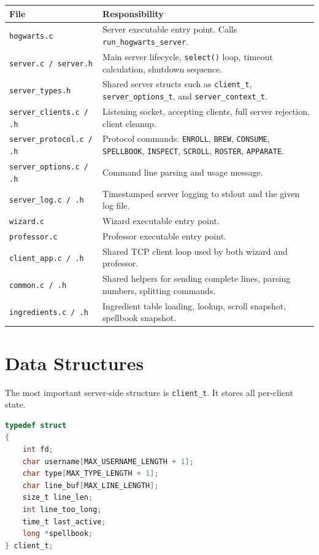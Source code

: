\documentclass[11pt,a4paper]{article}
\begin{document}
\begin{longtable}{|p{4.1cm}|p{10.1cm}|}
\hline
\textbf{File} & \textbf{Responsibility} \\
\hline
\texttt{hogwarts.c} & Server executable entry point. Calls \texttt{run\_hogwarts\_server}. \\
\hline
\texttt{server.c / server.h} & Main server lifecycle, \texttt{select()} loop, timeout calculation, shutdown sequence. \\
\hline
\texttt{server\_types.h} & Shared server structs such as \texttt{client\_t}, \texttt{server\_options\_t}, and \texttt{server\_context\_t}. \\
\hline
\texttt{server\_clients.c / .h} & Listening socket, accepting clients, full server rejection, client cleanup. \\
\hline
\texttt{server\_protocol.c / .h} & Protocol commands: \texttt{ENROLL}, \texttt{BREW}, \texttt{CONSUME}, \texttt{SPELLBOOK}, \texttt{INSPECT}, \texttt{SCROLL}, \texttt{ROSTER}, \texttt{APPARATE}. \\
\hline
\texttt{server\_options.c / .h} & Command line parsing and usage message. \\
\hline
\texttt{server\_log.c / .h} & Timestamped server logging to stdout and the given log file. \\
\hline
\texttt{wizard.c} & Wizard executable entry point. \\
\hline
\texttt{professor.c} & Professor executable entry point. \\
\hline
\texttt{client\_app.c / .h} & Shared TCP client loop used by both wizard and professor. \\
\hline
\texttt{common.c / .h} & Shared helpers for sending complete lines, parsing numbers, splitting commands. \\
\hline
\texttt{ingredients.c / .h} & Ingredient table loading, lookup, scroll snapshot, spellbook snapshot. \\
\hline
\end{longtable}

\section{Data Structures}

The most important server-side structure is \texttt{client\_t}. It stores all per-client state.

\begin{lstlisting}[language=C]
typedef struct
{
    int fd;
    char username[MAX_USERNAME_LENGTH + 1];
    char type[MAX_TYPE_LENGTH + 1];
    char line_buf[MAX_LINE_LENGTH];
    size_t line_len;
    int line_too_long;
    time_t last_active;
    long *spellbook;
} client_t;
\end{lstlisting}
\end{document}
